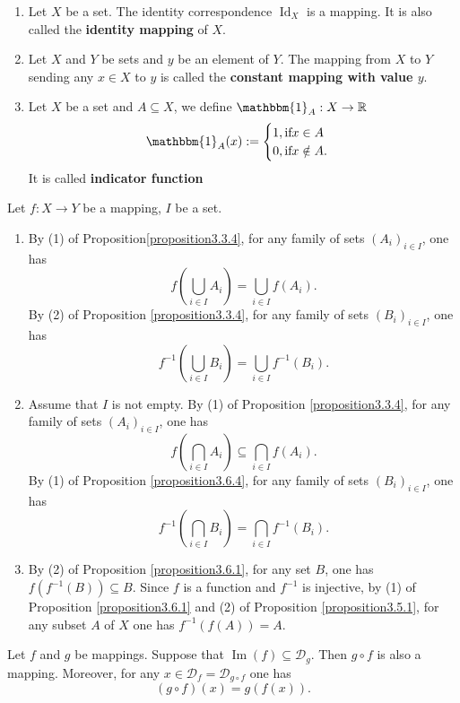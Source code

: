 \begin{exampleenv}
    \quad
    \begin{enumerate}
    \item Let \( X \) be a set. The identity correspondence \( \operatorname{Id}_X \) is a mapping. It is also called the \textbf{identity mapping} of \( X \).
    \item Let \( X \) and \( Y \) be sets and \( y \) be an element of \( Y \). The mapping from \( X \) to \( Y \) sending any \( x \in X \) to \( y \) is called the \textbf{constant mapping with value \( y \)}.
    \item Let $X$ be a set and $A\subseteq X$,  we define $\mathbbm{1}_A:X\rightarrow \mathbb{R}$   
    $$\mathbbm{1}_A(x):=\begin{cases}
 1,  \text{if}\space x \in A \\0, \text{if}\space x \notin A.

\end{cases}$$ 
It is called \textbf{indicator function}
\end{enumerate}
\end{exampleenv}


\begin{remark}
   Let \( f: X \to Y \) be a mapping,  \( I \) be a set.
\begin{enumerate}
    \item By (1) of Proposition\ref{proposition3.3.4},  for any family of sets \( (A_i)_{i \in I} \),  one has
    \[
    f\left(\bigcup_{i \in I} A_i\right) = \bigcup_{i \in I} f(A_i).
    \]
    By (2) of Proposition \ref{proposition3.3.4},  for any family of sets \( (B_i)_{i \in I} \),  one has
    \[
    f^{-1}\left(\bigcup_{i \in I} B_i\right) = \bigcup_{i \in I} f^{-1}(B_i).
    \]
    \item Assume that \( I \) is not empty. By (1) of Proposition \ref{proposition3.3.4},  for any family of sets \( (A_i)_{i \in I} \),  one has
    \[
    f\left(\bigcap_{i \in I} A_i\right) \subseteq \bigcap_{i \in I} f(A_i).
    \]
    By (1) of Proposition \ref{proposition3.6.4},  for any family of sets \( (B_i)_{i \in I} \),  one has
    \[
    f^{-1}\left(\bigcap_{i \in I} B_i\right) = \bigcap_{i \in I} f^{-1}(B_i).
    \]
    \item By (2) of Proposition \ref{proposition3.6.1},  for any set \( B \),  one has \( f(f^{-1}(B)) \subseteq B \). Since \( f \) is a function and \( f^{-1} \) is injective,  by (1) of Proposition \ref{proposition3.6.1} and (2) of Proposition \ref{proposition3.5.1},  for any subset \( A \) of \( X \) one has \( f^{-1}(f(A)) = A \).
\end{enumerate}

 
\end{remark}
\begin{propositionenv}\label{proposition3.7.1}
    Let \( f \) and \( g \) be mappings. Suppose that \( \operatorname{Im}(f) \subseteq \mathscr{D}_g \). Then \( g \circ f \) is also a mapping. Moreover,  for any \( x \in \mathscr{D}_f = \mathscr{D}_{g \circ f} \) one has
\[
(g \circ f)(x) = g(f(x)).
\]

\end{propositionenv}

